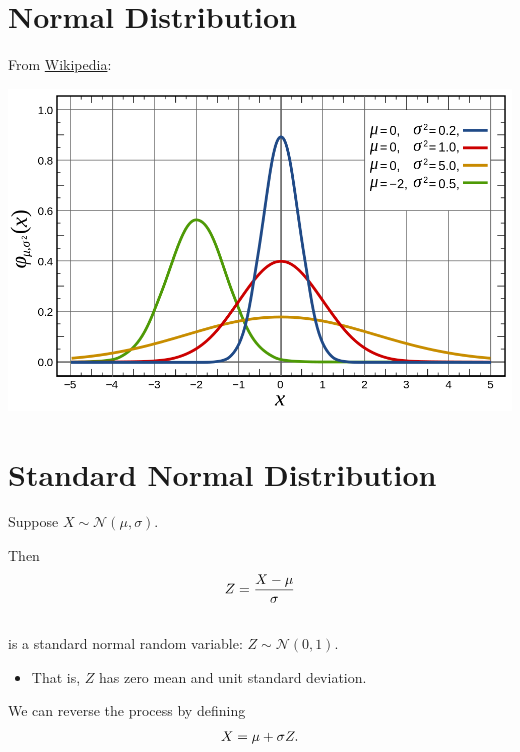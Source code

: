 \documentclass[letterpaper,10pt,english]{sphinxmanual}
\begin{document}
\section{Normal Distribution}
\label{probability:id4}
From \href{http://en.wikipedia.org/wiki/Normal\_distribution}{Wikipedia}:

\includegraphics[width=6in]{Normal_Distribution_PDF.png}


\section{Standard Normal Distribution}
\label{probability:standard-normal-distribution}
Suppose $X \sim \mathcal{N}(\mu, \sigma)$.

Then
\begin{gather}
\begin{split}Z = \frac{X - \mu}{\sigma}\end{split}\notag\\\begin{split}\end{split}\notag
\end{gather}
is a standard normal random variable: $Z \sim
\mathcal{N}(0,1)$.
\begin{itemize}
\item {} 
That is, $Z$ has zero mean and unit standard deviation.

\end{itemize}

We can reverse the process by defining
\begin{gather}
\begin{split}X = \mu + \sigma Z.\end{split}\notag
\end{gather}
\end{document}
